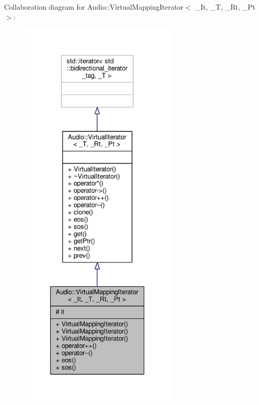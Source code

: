 Collaboration diagram for Audio\+:\+:Virtual\+Mapping\+Iterator$<$ \+\_\+\+It, \+\_\+T, \+\_\+\+Rt, \+\_\+\+Pt $>$\+:
\nopagebreak
\begin{figure}[H]
\begin{center}
\leavevmode
\includegraphics[height=550pt]{de/d7a/classAudio_1_1VirtualMappingIterator__coll__graph}
\end{center}
\end{figure}
